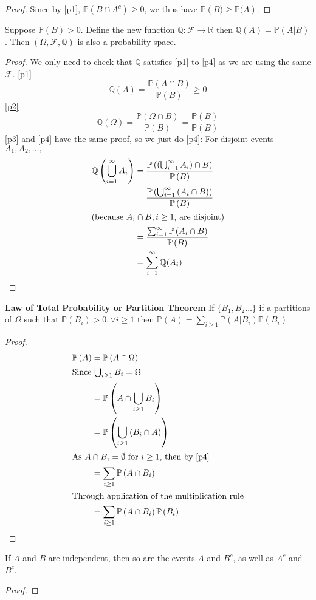 \documentclass[fontsize=10pt]{article}
\numberwithin{equation}{subsection}
\newcommand{\PP}[1]{\mathbb{P}\left(#1\right)}
\newcommand{\setreal}{\mathbb{R}}
\newcommand{\FF}{\mathcal{F}}
\begin{document}
\begin{itemize*}
\begin{multicols}{2}
\begin{proof}
Since by \eqref{p1}, $\mathbb{P}(B\cap A^c)\ge 0$, we thus have $\PP{B)\ge\mathbb{P}(A}$.
\end{proof}
\item Suppose $\PP{B}>0$.  Define the new function $\mathbb{Q} : \FF \to \setreal$ then $\mathbb{Q}(A)=\PP{A|B}$.  Then $(\Omega, \FF, \mathbb{Q})$ is also a probability space.
\begin{proof}
We only need to check that $\mathbb{Q}$ satisfies \eqref{p1} to \eqref{p4} as we are using the same $\FF$.
\eqref{p1}\[\mathbb{Q}(A)=\frac{\PP{A\cap B}}{\PP{B}}\ge0\]
\eqref{p2}\[\mathbb{Q}(\Omega)=\frac{\PP{\Omega\cap B}}{\PP{B}}=\frac{\PP{B}}{\PP{B}}\]
\eqref{p3} and \eqref{p4} have the same proof, so we just do \eqref{p4}: For disjoint events $A_1, A_2,\ldots,$
\begin{align*}
\mathbb{Q}\left(\bigcup_{i=1}^\infty A_i\right)&=\frac{\mathbb{P}\left(\left(\bigcup_{i=1}^\infty A_i\right)\cap B\right)}{\PP{B}}\\
&=\frac{\mathbb{P}\left(\bigcup_{i=1}^\infty\left( A_i\cap B\right)\right)}{\PP{B}}\\
\intertext{(because $A_i\cap B, i\ge 1$, are disjoint)}
&=\frac{\sum_{i=1}^\infty\mathbb{P}\left(A_i\cap B\right)}{\PP{B}}\\
&=\sum_{i=1}^\infty\mathbb{Q}(A_i)
\end{align*}
\end{proof}
\item {\bf Law of Total Probability or Partition Theorem}  If $\{B_1,B_2\ldots\}$ if a partitions of $\Omega$ such that $\mathbb{P}\left(B_i\right)>0,\forall i\ge1$ then $\PP{A}=\sum_{i\ge1}\PP{A|B_i}\PP{B_i}$
\begin{proof}
\begin{align*}
\PP{A}&=\PP{A\cap\Omega}\\
\intertext{Since $\bigcup_{i\ge1}B_i=\Omega$}&=\PP{A\cap\bigcup_{i\ge1}B_i}\\
&=\PP{\bigcup_{i\ge1}\left(B_i\cap A\right)}\\
\intertext{As $A\cap B_i=\emptyset\text{ for }i\ge1$, then by \eqref{p4}}&=\sum_{i\ge1}\PP{A\cap B_i}\\
\intertext{Through application of the multiplication rule}&=\sum_{i\ge1}\PP{A\cap B_i}\PP{B_i}
\end{align*}
\end{proof}
\item If $A$ and $B$ are independent, then so are the events $A$ and $B^c$, as well as $A^c$ and $B^c$.
\begin{proof}

\end{proof}
\end{multicols}
\end{itemize*}
\end{document}
